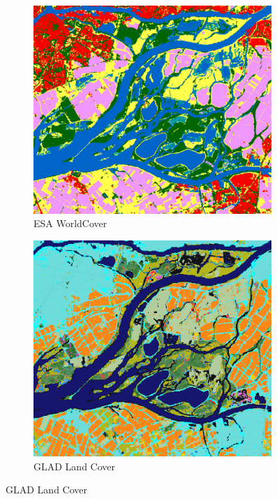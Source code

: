 \begin{figure}[H]
    \centering
    \begin{subfigure}[b]{0.48\textwidth} %
        \centering
        \includegraphics[width=0.99\textwidth,height=0.99\textwidth]{figs_01/a_worldcover.png}
        \caption{ESA WorldCover}
        \label{fig:lc_worldcover}
    \end{subfigure}
    \hfill %
    \begin{subfigure}[b]{0.48\textwidth} %
        \centering
        \includegraphics[width=0.99\textwidth,height=0.99\textwidth]{figs_01/a_glad.png}
        \caption{GLAD Land Cover}
        \label{fig:lc_glad}
    \end{subfigure}
    

\end{figure}
